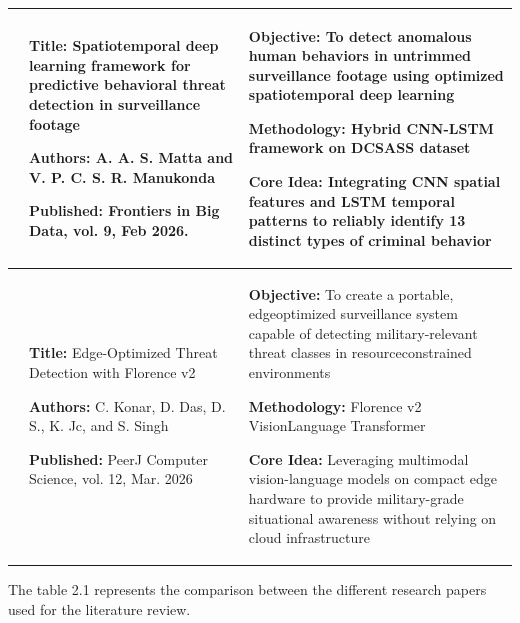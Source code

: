 \begin{center}
\begin{longtable}{
        |>{\centering\arraybackslash}p{1.22cm}
        |>{\raggedright\arraybackslash}p{6.3cm}
        |>{\raggedright\arraybackslash}p{6.3cm}|
        }
        10                                                                                           &
        \textbf{Title:} Spatiotemporal deep learning framework for predictive behavioral threat detection in surveillance footage \par
        \textbf{Authors:} A. A. S. Matta and V. P. C. S. R. Manukonda \par
        \textbf{Published:} Frontiers in
        Big Data, vol. 9, Feb 2026.                                                                  &
        \textbf{Objective:} To detect anomalous human behaviors in untrimmed surveillance footage using optimized spatiotemporal deep learning \par
        \textbf{Methodology:} Hybrid CNN-LSTM framework on DCSASS dataset \par
        \textbf{Core Idea:} Integrating CNN spatial features and LSTM temporal patterns to reliably identify 13 distinct types of criminal behavior                                                      \\
        \hline

        11                                                                                           &
        \textbf{Title:} Edge-Optimized Threat Detection with Florence v2 \par
        \textbf{Authors:} C. Konar, D. Das, D. S., K. Jc, and S. Singh  \par
        \textbf{Published:} PeerJ
        Computer Science, vol. 12, Mar. 2026                                                         &
        \textbf{Objective:} To create a portable, edgeoptimized surveillance system capable of detecting military-relevant threat classes in resourceconstrained environments \par
        \textbf{Methodology:} Florence v2 VisionLanguage Transformer \par
        \textbf{Core Idea:} Leveraging multimodal vision-language models on compact edge hardware to provide military-grade situational awareness without relying on cloud infrastructure                \\
        \hline
    \end{longtable}
\end{center}

The table 2.1 represents the comparison between the different research papers used for the literature review.